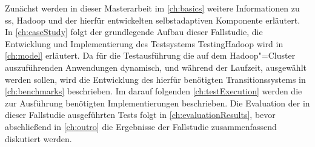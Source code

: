 Zunächst werden in dieser Masterarbeit im \cref{ch:basics} weitere Informationen zu \gls{ss}, Hadoop und der hierfür entwickelten selbstadaptiven Komponente erläutert.
In \cref{ch:caseStudy} folgt der grundlegende Aufbau dieser Fallstudie, die Entwicklung und Implementierung des Testsystems TestingHadoop wird in \cref{ch:model} erläutert.
Da für die Testausführung die auf dem Hadoop"=Cluster auszuführenden Anwendungen dynamisch, und während der Laufzeit, ausgewählt werden sollen, wird die Entwicklung des hierfür benötigten Transitionssystems in \cref{ch:benchmarks} beschrieben.
Im darauf folgenden \cref{ch:testExecution} werden die zur Ausführung benötigten Implementierungen beschrieben.
Die Evaluation der in dieser Fallstudie ausgeführten Tests folgt in \cref{ch:evaluationResults}, bevor abschließend in \cref{ch:outro} die Ergebnisse der Fallstudie zusammenfassend diskutiert werden.
